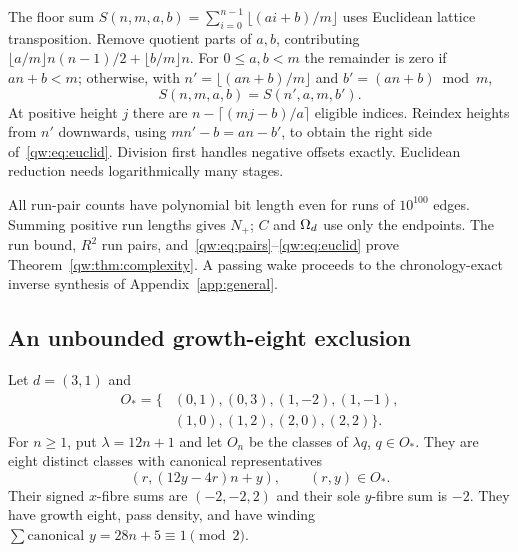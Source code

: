 The floor sum $S(n,m,a,b)=\sum_{i=0}^{n-1}\lfloor(ai+b)/m\rfloor$ uses Euclidean
lattice transposition. Remove quotient parts of $a,b$, contributing
$\lfloor a/m\rfloor n(n-1)/2+\lfloor b/m\rfloor n$.
For $0\le a,b<m$ the remainder is zero if $an+b<m$; otherwise, with
$n'=\lfloor(an+b)/m\rfloor$ and $b'=(an+b)\bmod m$,
\begin{equation}
 S(n,m,a,b)=S(n',a,m,b').\label{qw:eq:euclid}
\end{equation}
At positive height $j$ there are $n-\lceil(mj-b)/a\rceil$ eligible indices.
Reindex heights from $n'$ downwards, using $mn'-b=an-b'$, to obtain the right
side of~\eqref{qw:eq:euclid}. Division first handles negative offsets exactly.
Euclidean reduction needs logarithmically many stages.

All run-pair counts have polynomial bit length even for runs of $10^{100}$ edges.
Summing positive run lengths gives $N_+$; $C$ and $\Omega_d$ use only the endpoints.
The run bound, $R^2$ run pairs, and~\eqref{qw:eq:pairs}--\eqref{qw:eq:euclid} prove
Theorem~\ref{qw:thm:complexity}. A passing wake proceeds to the chronology-exact inverse synthesis of
Appendix~\ref{app:general}.

\subsection{An unbounded growth-eight exclusion}\label{qw:sec:family}
Let $d=(3,1)$ and
\begin{align*}
 O_* =\{&(0,1),(0,3),(1,-2),(1,-1),\\[-2pt]
        &(1,0),(1,2),(2,0),(2,2)\}.
\end{align*}
For $n\ge1$, put $\lambda=12n+1$ and let $O_n$ be the classes of $\lambda q$,
$q\in O_*$. They are eight distinct classes with canonical representatives
\[
 (r,(12y-4r)n+y),\qquad (r,y)\in O_*.
\]
Their signed $x$-fibre sums are $(-2,-2,2)$ and their sole $y$-fibre sum is $-2$.
They have growth eight, pass density, and have winding
$\sum\text{canonical }y=28n+5\equiv1\pmod2$.

